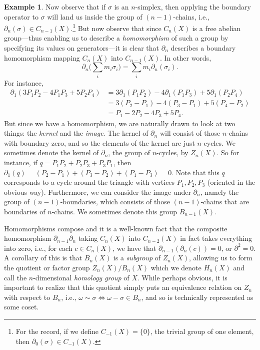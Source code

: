 \documentclass[a4paper]{book}
\theoremstyle{definition}
\newtheorem{example}{Example}[section]
\theoremstyle{definition}
\theoremstyle{definition}
\theoremstyle{theorem}
\theoremstyle{definition}
\begin{document}
\begin{example}
	Now observe that if $\sigma$ is an $n$-simplex, then applying the boundary operator to $\sigma$ will land us inside the group of $(n-1)$-chains, i.e., $\partial_n(\sigma) \in C_{n-1}(X)$.\footnote{For the record, if we define $C_{-1}(X) = \{0\}$, the trivial group of one element, then $\partial_0(\sigma) \in C_{-1}(X)$.} But now observe that since $C_n(X)$ is a free abelian group---thus enabling us to describe a \textit{homomorphism} of such a group by specifying its values on generators---it is clear that $\partial_n$ describes a boundary homomorphism mapping $C_n(X)$ into $C_{n-1}(X)$. In other words, 
	\begin{equation}
	\partial_n \Big(\sum_i m_i \sigma_i \Big) = \sum_i m_i \partial_n (\sigma_i).
	\end{equation}
	For instance, 	 
	\begin{align*}
	\partial_1(3P_1P_2 - 4P_1P_3 + 5P_2P_4) & =  3 \partial_1 (P_1P_2) - 4\partial_1(P_1P_3) + 5\partial_1(P_2P_4) \\
	& = 3(P_2-P_1) -4(P_3-P_1) + 5(P_4-P_2) \\
	& = P_1 - 2P_2 - 4P_3 + 5P_4. 
	\end{align*} 
	But since we have a homomorphism, we are naturally drawn to look at two things: the \textit{kernel} and the \textit{image}. The kernel of $\partial_n$ will consist of those $n$-chains with boundary zero, and so the elements of the kernel are just $n$-cycles. We sometimes denote the kernel of $\partial_n$, the group of $n$-cycles, by $Z_n(X)$. So for instance, if $q = P_1P_2 + P_2P_3 +P_3P_1$, then $\partial_1(q) = (P_2 - P_1) + (P_3 - P_2) + (P_1 - P_3) = 0$. Note that this $q$ corresponds to a cycle around the triangle with vertices $P_1, P_2,P_3$ (oriented in the obvious way). Furthermore, we can consider the image under $\partial_n$, namely the group of $(n-1)$-boundaries, which consists of those $(n-1)$-chains that are boundaries of $n$-chains. We sometimes denote this group $B_{n-1}(X)$.\par 
	Homomorphisms compose and it is a well-known fact that the composite homomorphism $\partial_{n-1}\partial_{n}$ taking $C_n(X)$ into $C_{n-2}(X)$ in fact takes everything into zero, i.e., for each $c \in C_n(X)$, we have that $\partial_{n-1}(\partial_n(c)) = 0$, or $\partial^2 = 0$. A corollary of this is that $B_n(X)$ is a \textit{subgroup} of $Z_n(X)$, allowing us to form the quotient or factor group $Z_n(X)/B_n(X)$ which we denote $H_n(X)$ and call the $n$-dimensional \textit{homology group} of $X$. While perhaps obvious, it is important to realize that this quotient simply puts an equivalence relation on $Z_n$ with respect to $B_n$, i.e., $\omega \sim \sigma \iff \omega - \sigma \in B_n$, and so is technically represented as some coset. \par 

\end{example}
\end{document}
